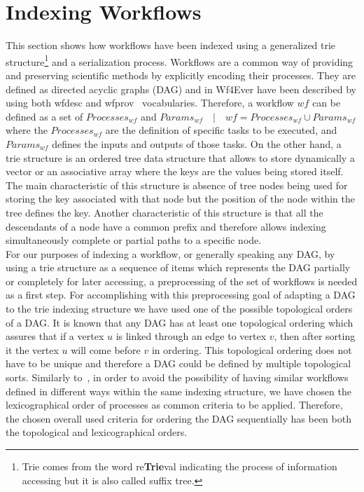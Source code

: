\section{Indexing Workflows}
\label{sec:indexation}

This section shows how workflows have been indexed using a generalized trie structure\footnote{Trie comes from the word re{\bf Trie}val indicating the process of information accessing but it is also called suffix tree.} and a serialization process. Workflows are a common way of providing and preserving scientific methods by explicitly encoding their processes. They are defined as directed acyclic graphs (DAG) and in Wf4Ever have been described by using both wfdesc and wfprov~\cite{ro_model} vocabularies. Therefore, a workflow $wf$ can be defined as a set of $Processes_{wf}$ and $Params_{wf} \quad | \quad wf = Processes_{wf} \cup Params_{wf}$ where the $Processes_{wf}$ are the definition of specific tasks to be executed, and $Params_{wf}$ defines the inputs and outputs of those tasks. On the other hand, a trie structure is an ordered tree data structure that allows to store dynamically a vector or an associative array where the keys are the values being stored itself. The main characteristic of this structure is absence of tree nodes being used for storing the key associated with that node but the position of the node within the tree defines the key. Another characteristic of this structure is that all the descendants of a node have a common prefix and therefore allows indexing simultaneously complete or partial paths to a specific node. \\

For our purposes of indexing a workflow, or generally speaking any DAG, by using a trie structure as a sequence of items which represents the DAG partially or completely for later accessing, a preprocessing of the set of workflows is needed as a first step. For accomplishing with this preprocessing goal of adapting a DAG to the trie indexing structure we have used one of the possible topological orders of a DAG. It is known that any DAG has at least one topological ordering which assures that if a vertex $u$ is linked through an edge to vertex $v$, then after sorting it the vertex $u$ will come before $v$ in ordering. This topological ordering does not have to be unique and therefore a DAG could be defined by multiple topological sorts. Similarly to~\cite{Matono03anindexing}, in order to avoid the possibility of having similar workflows defined in  different ways within the same indexing structure, we have chosen the lexicographical order of processes as common criteria to be applied. Therefore, the chosen overall used criteria for ordering the DAG sequentially has been both the topological and lexicographical orders. \\


